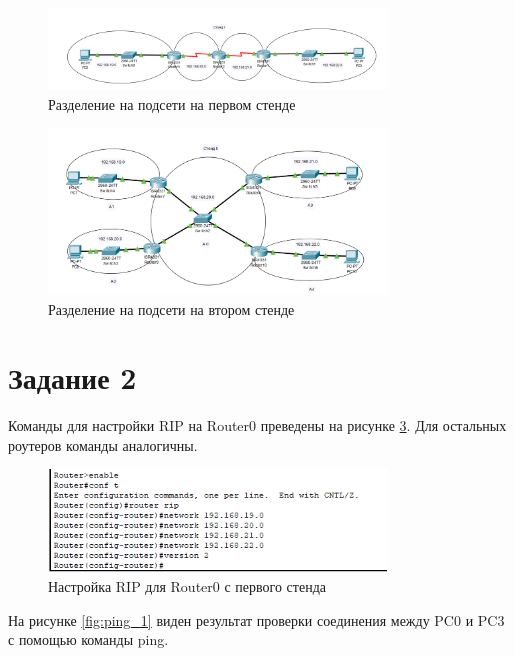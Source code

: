 \begin{figure}[H]
    \centering
    \includegraphics[width=0.8\textwidth]{img/content/stand_1.png}
    \caption{Разделение на подсети на первом стенде}
    \label{fig:stand1}
\end{figure}

\begin{figure}[H]
    \centering
    \includegraphics[width=0.8\textwidth]{img/content/stand_2.png}
    \caption{Разделение на подсети на втором стенде}
    \label{fig:stand2}
\end{figure}

\section{Задание 2}

Команды для настройки RIP на Router0 преведены на рисунке \ref{fig:rip}. Для остальных роутеров команды аналогичны.

\begin{figure}[H]
    \centering
    \includegraphics[width=0.8\textwidth]{img/content/rip_router.png}
    \caption{Настройка RIP для Router0 с первого стенда}
    \label{fig:rip}
\end{figure}

На рисунке \ref{fig:ping_1} виден результат проверки соединения между PC0 и PC3 с помощью команды ping.

